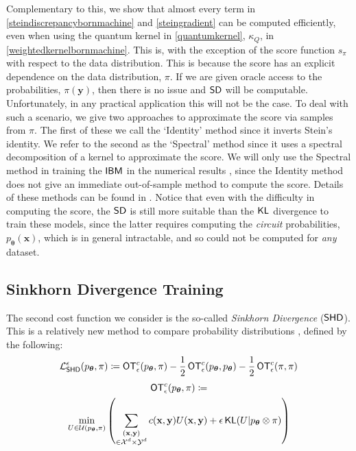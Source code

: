 \noindent Complementary to this, we show that almost every term in \eqref{steindiscrepancybornmachine} and \eqref{steingradient} can be computed efficiently, even when using the quantum kernel in \eqref{quantumkernel}, $\kappa_Q$, in \eqref{weightedkernelbornmachine}. This is, with the exception of the score function $s_\pi$ with respect to the data distribution. This is because the score has an explicit dependence on the data distribution, $\pi$. If we are given oracle access to the probabilities, $\pi(\mathbf{y})$, then there is no issue and $\operatorname{\textsf{SD}}$ will be computable. Unfortunately, in any practical application this will not be the case. To deal with such a scenario, we give two approaches to approximate the score via samples from $\pi$. The first of these we call the `Identity' method since it inverts Stein's identity\cite{li_gradient_2018}. We refer to the second as the `Spectral' method since it uses a spectral decomposition\cite{shi_spectral_2018} of a kernel to approximate the score. We will only use the Spectral method in training the $\textsf{IBM}$ in the numerical results , since the Identity method does not give an immediate out-of-sample method to compute the score. Details of these methods can be found in . Notice that even with the difficulty in computing the score, the $\operatorname{\textsf{SD}}$ is still more suitable than the $\operatorname{\textsf{KL}}$ divergence to train these models, since the latter requires computing the \textit{circuit} probabilities, $p_{\boldsymbol\theta}(\mathbf{x})$, which is in general intractable, and so could not be computed for \textit{any} dataset. 


\subsection*{Sinkhorn Divergence Training \label{ssec:sinkhorntrainingofibm}}
The second cost function we consider is the so-called \textit{Sinkhorn Divergence} ($\operatorname{\textsf{SHD}}$). This is a relatively new method to compare probability distributions \cite{ramdas_wasserstein_2015, genevay_learning_2017, feydy_interpolating_2018} , defined by the following:
\begin{align}
    \mathcal{L}_{\operatorname{\textsf{SHD}}}^\epsilon(p_{\boldsymbol\theta}, \pi) \coloneqq \operatorname{\textsf{OT}}^c_\epsilon(p_{\boldsymbol\theta}, \pi) - \frac{1}{2} \operatorname{\textsf{OT}}^c_\epsilon(p_{\boldsymbol\theta}, p_{\boldsymbol\theta}) -\frac{1}{2}\operatorname{\textsf{OT}}^c_\epsilon(\pi, \pi) \label{sinkhorndivergence}
\end{align}
\begin{multline}
    \operatorname{\textsf{OT}}^c_\epsilon(p_{\boldsymbol\theta}, \pi) \coloneqq \\
      \min\limits_{U \in \mathcal{U}(p_{\boldsymbol\theta}, \pi)}\left(\sum\limits_{\substack{(\mathbf{x}, \mathbf{y})\\ \in \mathcal{X}^d\times\mathcal{Y}^d}} c(\mathbf{x}, \mathbf{y})U(\mathbf{x}, \mathbf{y}) + \epsilon \operatorname{\textsf{KL}}(U|p_{\boldsymbol\theta}\otimes \pi)\right) \label{wassersteinregularised}
\end{multline}

